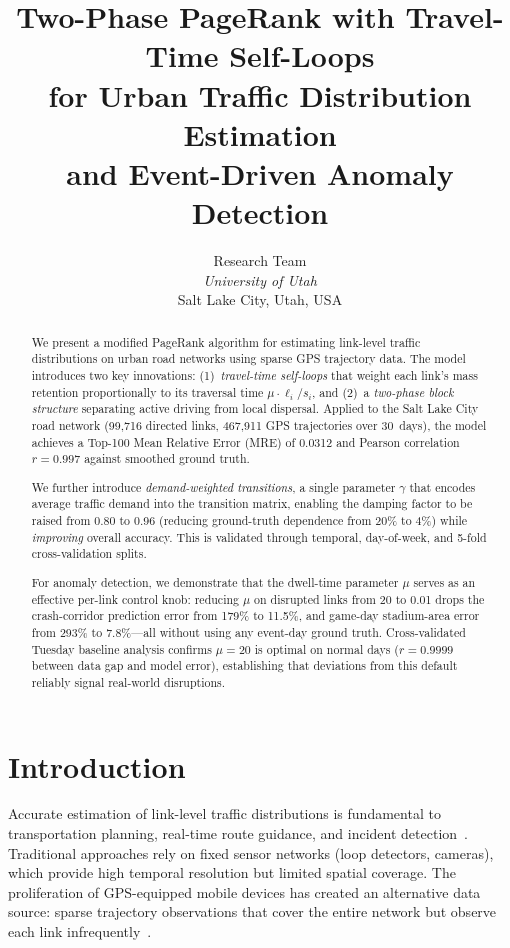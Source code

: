 \documentclass[11pt]{article}
\title{\textbf{Two-Phase PageRank with Travel-Time Self-Loops\\ for Urban Traffic Distribution Estimation\\ and Event-Driven Anomaly Detection}}
\author{
  Research Team\\
  \textit{University of Utah}\\
  Salt Lake City, Utah, USA
}
\date{}
\begin{document}
\maketitle

\begin{abstract}
We present a modified PageRank algorithm for estimating link-level traffic distributions on urban road networks using sparse GPS trajectory data.
The model introduces two key innovations: (1)~\emph{travel-time self-loops} that weight each link's mass retention proportionally to its traversal time $\mu \cdot \ell_i / s_i$, and (2)~a \emph{two-phase block structure} separating active driving from local dispersal.
Applied to the Salt Lake City road network (99,716 directed links, 467,911 GPS trajectories over 30~days), the model achieves a Top-100 Mean Relative Error (MRE) of 0.0312 and Pearson correlation $r = 0.997$ against smoothed ground truth.

We further introduce \emph{demand-weighted transitions}, a single parameter $\gamma$ that encodes average traffic demand into the transition matrix, enabling the damping factor to be raised from 0.80 to 0.96 (reducing ground-truth dependence from 20\% to 4\%) while \emph{improving} overall accuracy.
This is validated through temporal, day-of-week, and 5-fold cross-validation splits.

For anomaly detection, we demonstrate that the dwell-time parameter $\mu$ serves as an effective per-link control knob: reducing $\mu$ on disrupted links from 20 to 0.01 drops the crash-corridor prediction error from 179\% to 11.5\%, and game-day stadium-area error from 293\% to 7.8\%---all without using any event-day ground truth.
Cross-validated Tuesday baseline analysis confirms $\mu = 20$ is optimal on normal days ($r = 0.9999$ between data gap and model error), establishing that deviations from this default reliably signal real-world disruptions.
\end{abstract}

\section{Introduction}
\label{sec:intro}

Accurate estimation of link-level traffic distributions is fundamental to transportation planning, real-time route guidance, and incident detection~\cite{wardrop1952road, jiang2009citywide}.
Traditional approaches rely on fixed sensor networks (loop detectors, cameras), which provide high temporal resolution but limited spatial coverage.
The proliferation of GPS-equipped mobile devices has created an alternative data source: sparse trajectory observations that cover the entire network but observe each link infrequently~\cite{herrera2010evaluation, zheng2014urban}.
\end{document}
